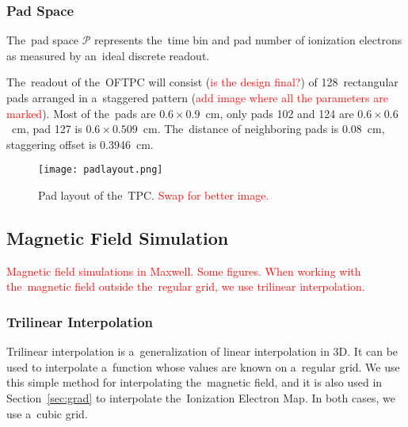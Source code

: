 			\subsubsection{Pad Space}
				The~pad space $\mathcal{P}$ represents the~time bin and pad number of ionization electrons as measured by an~ideal discrete readout.
			
				The~readout of the~\ac{OFTPC} will consist (\textcolor{red}{is the design final?}) of 128~rectangular pads arranged in a~staggered pattern (\textcolor{red}{add image where all the parameters are marked}). Most of the~pads are $0.6 \times 0.9$~cm, only pads 102 and 124 are $0.6 \times 0.6$~cm, pad 127 is $0.6 \times 0.509$~cm. The~distance of neighboring pads is 0.08~cm, staggering offset is 0.3946~cm.
	
				\begin{figure}[H]
					\centering
					\texttt{[image: padlayout.png]}
					\caption{Pad layout of the~TPC. \textcolor{red}{Swap for better image.}}
					\label{fig:padlayout}
				\end{figure}
				
		\subsection{Magnetic Field Simulation}
		\textcolor{red}{Magnetic field simulations in Maxwell. Some figures. When working with the~magnetic field outside the~regular grid, we use trilinear interpolation.}
		
			\subsubsection{Trilinear Interpolation}
			\label{sec:trilin}
				Trilinear interpolation is a~generalization of linear interpolation in 3D. It can be used to interpolate a~function whose values are known on a~regular grid. We use this simple method for interpolating the~magnetic field, and it is also used in Section~\ref{sec:grad} to interpolate the~Ionization Electron Map. In both cases, we use a~cubic grid.
				
